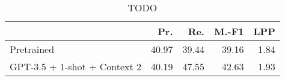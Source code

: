 \begin{table}[!ht]
\centering
\caption{TODO}
\label{tab:finetune-results}
\begin{tabular}{lrrrr}
\toprule
 & Pr. & Re. & M.-F1 & LPP \\
\midrule
Pretrained & 40.97 & 39.44 & 39.16 & 1.84 \\
GPT-3.5 + 1-shot + Context 2 & 40.19 & 47.55 & 42.63 & 1.93 \\
\bottomrule
\end{tabular}
\end{table}
